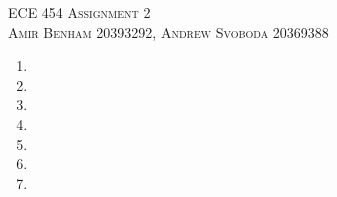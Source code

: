 \documentclass{article}
\begin{document}
\begin{center}
\textsc{\Large ECE 454 Assignment 2}\\[0.5cm]
\textsc{Amir Benham 20393292, Andrew Svoboda 20369388}\\[0.5cm]
\end{center}

\begin{enumerate}

\item

\item

\item

\item

\item

\item

\item

\end{enumerate}
\end{document}
